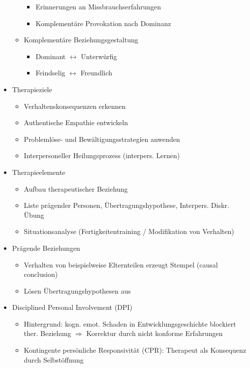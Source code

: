 \documentclass[11pt, paper=a4, twocolumn]{scrartcl}
\begin{document}
\begin{itemize}
\begin{itemize}
\begin{itemize}
							\item Erinnerungen an Missbrauchserfahrungen
							\item Komplementäre Provokation nach Dominanz
						\end{itemize}
					\item Komplementäre Beziehungsgestaltung
						\begin{itemize}
							\item Dominant $\leftrightarrow$ Unterwürfig
							\item Feindselig $\leftrightarrow$ Freundlich
						\end{itemize}
				\end{itemize}
			\item Therapieziele
				\begin{itemize}
					\item Verhaltenskonsequenzen erkennen
					\item Authentische Empathie entwickeln
					\item Problemlöse- und Bewältigungsstrategien anwenden
					\item Interpersoneller Heilungsprozess (interpers. Lernen)
				\end{itemize}
			\item Therapieelemente
				\begin{itemize}
					\item Aufbau therapeutischer Beziehung
					\item Liste prägender Personen, Übertragungshypothese, Interpers. Diskr. Übung
					\item Situationsanalyse (Fertigkeitentraining / Modifikation von Verhalten)
				\end{itemize}
			\item Prägende Beziehungen
				\begin{itemize}
					\item Verhalten von beispielweise Elternteilen erzeugt Stempel (causal conclusion)
					\item Lösen Übertragungshypothesen aus
				\end{itemize}
			\item Disciplined Personal Involvement (DPI)
				\begin{itemize}
					\item Hintergrund: kogn. emot. Schaden in Entwicklungsgeschichte blockiert ther. Beziehung 
						$\Rightarrow$ Korrektur durch nicht konforme Erfahrungen
					\item Kontingente persönliche Responsivität (CPR): Therapeut als Konsequenz durch Selbstöffnung

\end{itemize}
\end{itemize}
\end{document}
